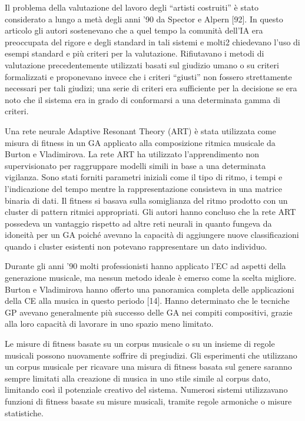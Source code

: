 \documentclass[a4paper,12pt]{report}
\begin{document}
Il problema della valutazione del lavoro degli “artisti costruiti” è stato considerato a lungo a metà degli anni ’90 da Spector e Alpern [92]. In questo articolo gli autori sostenevano che a quel tempo la comunità dell’IA era preoccupata del rigore e degli standard in tali sistemi e molti2 chiedevano l’uso di esempi standard e più criteri per la valutazione. Rifiutavano i metodi di valutazione precedentemente utilizzati basati sul giudizio umano o su criteri formalizzati e proponevano invece che i criteri “giusti” non fossero strettamente necessari per tali giudizi; una serie di criteri era sufficiente per la decisione se era noto che il sistema era in grado di conformarsi a una determinata gamma di criteri. 

Una rete neurale Adaptive Resonant Theory (ART) è stata utilizzata come misura di fitness in un GA applicato alla composizione ritmica musicale da Burton e Vladimirova. La rete ART ha utilizzato l’apprendimento non supervisionato per raggruppare modelli simili in base a una determinata vigilanza. 
Sono stati forniti parametri iniziali come il tipo di ritmo, i tempi e l'indicazione del tempo mentre la rappresentazione consisteva in una matrice binaria di dati. Il fitness si basava sulla somiglianza del ritmo prodotto con un cluster di pattern ritmici appropriati. Gli autori hanno concluso che la rete ART possedeva un vantaggio rispetto ad altre reti neurali in quanto fungeva da idoneità per un GA poiché avevano la capacità di aggiungere nuove classificazioni quando i cluster esistenti non potevano rappresentare un dato individuo.

Durante gli anni ’90 molti professionisti hanno applicato l’EC ad aspetti della generazione musicale, ma nessun metodo ideale è emerso come la scelta migliore. Burton e Vladimirova hanno offerto una panoramica completa delle applicazioni della CE alla musica in questo periodo [14]. Hanno determinato che le tecniche GP avevano generalmente più successo delle GA nei compiti compositivi, grazie alla loro capacità di lavorare in uno spazio meno limitato.

Le misure di fitness basate su un corpus musicale o su un insieme di regole musicali possono nuovamente soffrire di pregiudizi. Gli esperimenti che utilizzano un corpus musicale per ricavare una misura di fitness basata sul genere saranno sempre limitati alla creazione di musica in uno stile simile al corpus dato, limitando così il potenziale creativo del sistema. Numerosi sistemi utilizzavano funzioni di fitness basate su misure musicali, tramite regole armoniche o misure statistiche. 
\end{document}
